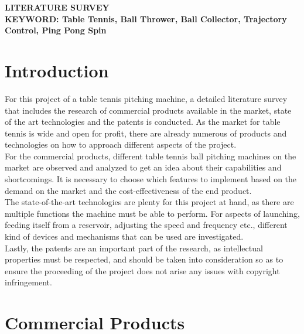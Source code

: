 \documentclass[12pt]{article}
\begin{document}
\begin{center}
    \vspace{1em} %
    \textbf{\LARGE LITERATURE SURVEY}\\
    \vspace{1em} %
    \textbf{KEYWORD: Table Tennis, Ball Thrower, Ball Collector, Trajectory Control, Ping Pong Spin}
\end{center}

\section{Introduction}

For this project of a table tennis pitching machine, a detailed literature survey that includes the research of commercial products available in the market, state of the art technologies and the patents is conducted. As the market for table tennis is wide and open for profit, there are already numerous of products and technologies on how to approach different aspects of the project.\\

For the commercial products, different table tennis ball pitching machines on the market are observed and analyzed to get an idea about their capabilities and shortcomings. It is necessary to choose which features to implement based on the demand on the market and the cost-effectiveness of the end product. \\

The state-of-the-art technologies are plenty for this project at hand, as there are multiple functions the machine must be able to perform. For aspects of launching, feeding itself from a reservoir, adjusting the speed and frequency etc., different kind of devices and mechanisms that can be used are investigated. \\

Lastly, the patents are an important part of the research, as intellectual properties must be respected, and should be taken into consideration so as to ensure the proceeding of the project does not arise any issues with copyright infringement.

\section{Commercial Products}
\end{document}
